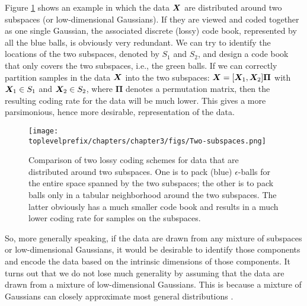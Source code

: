 \documentclass[../../book-main.tex]{subfiles}
\begin{document}
\begin{example}
	Figure \ref{fig:two-subspaces} shows an example in which the data $\bm{X}$ are distributed around two subspaces (or low-dimensional Gaussians). If they are viewed and coded together as one single Gaussian, the associated discrete (lossy) code book, represented by all the blue balls, is obviously very redundant. We can try to identify the locations of the two subspaces, denoted by $S_1$ and $S_2$, and design a code book that only covers the two subspaces, i.e., the green balls. If we can correctly partition samples in the data $\bm{X}$ into the two subspaces: $\bm{X} = [\bm{X}_1, \bm{X}_2]\bm \Pi$ with $\bm{X}_1 \in S_1$ and $\bm{X}_2 \in S_2$, where $\bm \Pi$ denotes a permutation matrix, then the resulting coding rate for the data will be much lower. This gives a more parsimonious, hence more desirable, representation of the data.
\end{example}

\begin{figure}
	\centering
	\texttt{[image: \\toplevelprefix/chapters/chapter3/figs/Two-subspaces.png]}
	\caption{Comparison of two lossy coding schemes for data that are distributed around two subspaces. One is to pack (blue) $\epsilon$-balls for the entire space spanned by the two subspaces; the other is to pack balls only in a tabular neighborhood around the two subspaces. The latter obviously has a much smaller code book and results in a much lower coding rate for samples on the subspaces.}
	\label{fig:two-subspaces}
\end{figure}

So, more generally speaking, if the data are drawn from any mixture of subspaces or low-dimensional Gaussians, it would be desirable to identify those components and encode the data based on the intrinsic dimensions of those components. It turns out that we do not lose much generality by assuming that the data are drawn from a mixture of low-dimensional Gaussians. This is because a mixture of Gaussians can closely approximate most general distributions \cite{borkar2016gaussian}. 
\end{document}
